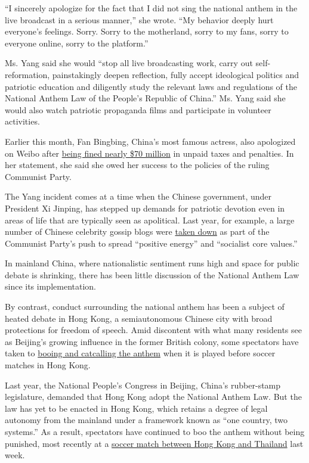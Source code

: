 ``I sincerely apologize for the fact that I did not sing the national
anthem in the live broadcast in a serious manner,'' she wrote. ``My
behavior deeply hurt everyone's feelings. Sorry. Sorry to the
motherland, sorry to my fans, sorry to everyone online, sorry to the
platform.''

Ms. Yang said she would ``stop all live broadcasting work, carry out
self-reformation, painstakingly deepen reflection, fully accept
ideological politics and patriotic education and diligently study the
relevant laws and regulations of the National Anthem Law of the People's
Republic of China.'' Ms. Yang said she would also watch patriotic
propaganda films and participate in volunteer activities.

Earlier this month, Fan Bingbing, China's most famous actress, also
apologized on Weibo after
\href{https://www.nytimes.com/2018/10/02/world/asia/fan-bingbing-tax-evasion-china.html}{being
fined nearly \$70 million} in unpaid taxes and penalties. In her
statement, she said she owed her success to the policies of the ruling
Communist Party.

The Yang incident comes at a time when the Chinese government, under
President Xi Jinping, has stepped up demands for patriotic devotion even
in areas of life that are typically seen as apolitical. Last year, for
example, a large number of Chinese celebrity gossip blogs were
\href{https://www.nytimes.com/2017/06/09/world/asia/china-celebrity-news-wechat.html}{taken
down} as part of the Communist Party's push to spread ``positive
energy'' and ``socialist core values.''

In mainland China, where nationalistic sentiment runs high and space for
public debate is shrinking, there has been little discussion of the
National Anthem Law since its implementation.

By contrast, conduct surrounding the national anthem has been a subject
of heated debate in Hong Kong, a semiautonomous Chinese city with broad
protections for freedom of speech. Amid discontent with what many
residents see as Beijing's growing influence in the former British
colony, some spectators have taken to
\href{https://www.nytimes.com/2017/10/11/world/asia/hong-kong-china-national-anthem-protest.html}{booing
and catcalling the anthem} when it is played before soccer matches in
Hong Kong.

Last year, the National People's Congress in Beijing, China's
rubber-stamp legislature, demanded that Hong Kong adopt the National
Anthem Law. But the law has yet to be enacted in Hong Kong, which
retains a degree of legal autonomy from the mainland under a framework
known as ``one country, two systems.'' As a result, spectators have
continued to boo the anthem without being punished, most recently at a
\href{https://www.scmp.com/sport/hong-kong/article/2168186/hong-kong-beaten-thailand-bumpy-start-gary-whites-tenure-national}{soccer
match between Hong Kong and Thailand} last week.

